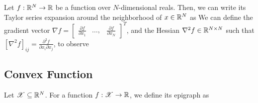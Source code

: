 \documentclass[a4paper,english,12pt]{article}
\begin{document}
{Let $f:\mathbb{R}^N\to\mathbb{R}$ be a function over $N$-dimensional reals. 
Then, we can write its Taylor series expansion around the neighborhood of $x \in \mathbb{R}^N$ as  
We can define the gradient vector $\nabla f = \begin{bmatrix}\frac{\partial f}{\partial x_1} & \hdots, & \frac{\partial f}{\partial x_N}\end{bmatrix}^T$, 
and the Hessian $\nabla^2f \in \mathbb{R}^{N \times N}$ such that $ [\nabla^2f]_{ij}= \frac{\partial^2 f}{\partial x_i\partial x_j}$, to observe 
	
\subsection{Convex Function}
Let $\mathscr{X} \subseteq \mathbb{R}^N$. 
For a function $f: \mathscr{X} \to \mathbb{R}$, we define its epigraph as 

}
\end{document}
